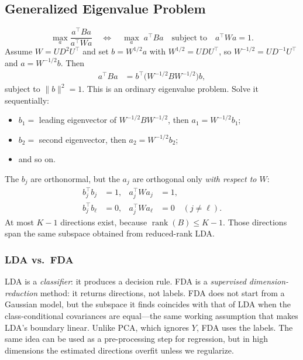 \documentclass[
]{book}
\providecommand{\tightlist}{%
  \setlength{\itemsep}{0pt}\setlength{\parskip}{0pt}}
\begin{document}
\subsection*{Generalized Eigenvalue Problem}\label{generalized-eigenvalue-problem}

\[
\max_a \frac{a^\top B a}{a^\top W a}
\quad\Longleftrightarrow\quad
\max_a \; a^\top B a \quad \text{subject to} \quad a^\top W a = 1.
\]
Assume \(W = U D^2 U^\top\) and set \(b = W^{1/2} a\) with \(W^{1/2} = U D U^\top\), so \(W^{-1/2} = U D^{-1} U^\top\) and \(a = W^{-1/2} b\). Then
\begin{align*}
a^\top B a
&= b^\top \bigl(W^{-1/2} B W^{-1/2}\bigr) b,
\end{align*}
subject to \(\|b\|^2 = 1\). This is an ordinary eigenvalue problem. Solve it sequentially:

\begin{itemize}
\tightlist
\item
  \(b_1 =\) leading eigenvector of \(W^{-1/2} B W^{-1/2}\), then \(a_1 = W^{-1/2} b_1\);
\item
  \(b_2 =\) second eigenvector, then \(a_2 = W^{-1/2} b_2\);
\item
  and so on.
\end{itemize}

The \(b_j\) are orthonormal, but the \(a_j\) are orthogonal only \emph{with respect to \(W\)}:
\begin{align*}
b_j^\top b_j &= 1, & a_j^\top W a_j &= 1, \\
b_j^\top b_\ell &= 0, & a_j^\top W a_\ell &= 0 \quad (j \ne \ell).
\end{align*}
At most \(K-1\) directions exist, because \(\operatorname{rank}(B) \le K-1\). Those directions span the same subspace obtained from reduced-rank LDA.

\subsubsection*{LDA vs.~FDA}\label{lda-vs.-fda}

LDA is a \emph{classifier}: it produces a decision rule. FDA is a \emph{supervised dimension-reduction} method: it returns directions, not labels. FDA does not start from a Gaussian model, but the subspace it finds coincides with that of LDA when the class-conditional covariances are equal---the same working assumption that makes LDA's boundary linear. Unlike PCA, which ignores \(Y\), FDA uses the labels. The same idea can be used as a pre-processing step for regression, but in high dimensions the estimated directions overfit unless we regularize.
\end{document}
